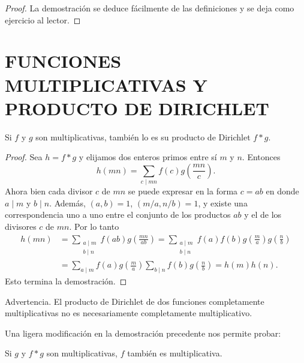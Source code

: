 \documentclass[12pt,a4paper]{book}
\begin{document}
    \begin{proof}
        La demostración se deduce fácilmente de las definiciones y se deja como ejercicio
        al lector.
    \end{proof}

    \section{FUNCIONES MULTIPLICATIVAS Y PRODUCTO DE DIRICHLET}

    \begin{teorema}
        Si $f$ y $g$ son multiplicativas, también lo es su producto de Dirichlet $f*g$.
    \end{teorema}

    \begin{proof}
        Sea $h=f*g$ y elijamos dos enteros primos entre sí $m$ y $n$. Entonces
        \begin{equation*}
            h(mn)=\sum_{c\mid mn}f(c)g\left(\frac{mn}{c}\right).
        \end{equation*}
        Ahora bien cada divisor $c$ de $mn$ se puede expresar en la forma $c=ab$ en donde
        $a\mid m$ y $b\mid n$. Además, $(a,b)=1$, $(m/a,n/b)=1$, y existe una
        correspondencia uno a uno entre el conjunto de los productos $ab$ y el de los
        divisores $c$ de $mn$. Por lo tanto
        \begin{align*}
            h(mn)&=\sum_{\substack{a\mid m\\ b\mid n}}f(ab)g\left(\frac{mn}{ab}\right)
            =\sum_{\substack{a\mid m\\ b\mid n}}f(a)f(b)g\left(\frac{m}{a}\right)g\left(\frac{n}{b}\right)\\
            &=\sum_{a\mid m}f(a)g\left(\frac{m}{a}\right)\sum_{b\mid n}f(b)g\left(\frac{n}{b}\right)=h(m)h(n).
        \end{align*}
        Esto termina la demostración.
    \end{proof}

    Advertencia. El producto de Dirichlet de dos funciones completamente multiplicativas
    no es necesariamente completamente multiplicativo.

    Una ligera modificación en la demostración precedente nos permite probar:

    \begin{teorema}
        Si $g$ y $f*g$ son multiplicativas, $f$ también es multiplicativa.
    \end{teorema}
\end{document}

